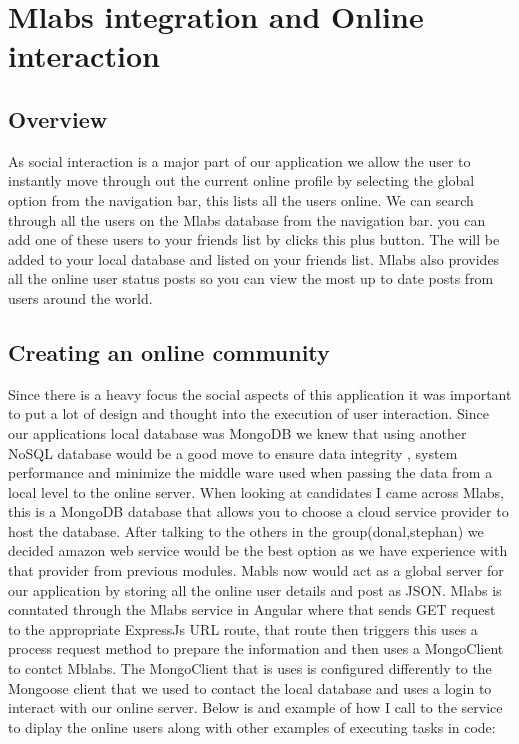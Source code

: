 \section{Mlabs integration and Online interaction}

\subsection{Overview}
As social interaction is a major part of our application we allow the user to instantly move through out the current online profile by selecting the global option from the navigation bar, this lists all the users online. We can search through all the users on the Mlabs database from the navigation bar. you can add one of these users to your friends list by clicks this plus button. The will be added to your local database and listed on your friends list. Mlabs also provides all the online user status posts so you can view the most up to date posts from users around the world.

\subsection{Creating an online community}
Since there is a heavy focus the social aspects of this application it was important to put a lot of design and thought into the execution of user interaction. Since our applications local database was MongoDB we knew that using another NoSQL database would be a good move to ensure data integrity , system performance and minimize the middle ware used when passing the data from a local level to the online server. When looking at candidates I came across Mlabs, this is a MongoDB database that allows you to choose a cloud service provider to host the database. After talking to the others in the group(donal,stephan) we decided amazon web service would be the best option as we have experience with that provider from previous modules. Mabls now would act as a global server for our application by storing all the online user details and post as JSON. Mlabs is conntated through the Mlabs service in Angular where that sends GET request to the appropriate ExpressJs URL route, that route then triggers this uses a process request method to prepare the information and then uses a MongoClient to contct Mblabs. The MongoClient that is uses is configured differently to the Mongoose client that we used to contact the local database and uses a login to interact with our online server. Below is and example of how I call to the service to diplay the online users along with other examples of executing tasks in code:
    
